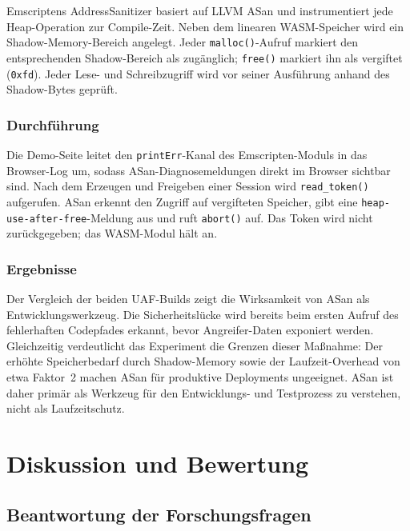 Emscriptens AddressSanitizer basiert auf LLVM ASan und instrumentiert jede Heap-Operation zur Compile-Zeit. Neben dem linearen WASM-Speicher wird ein Shadow-Memory-Bereich angelegt. Jeder \texttt{malloc()}-Aufruf markiert den entsprechenden Shadow-Bereich als zugänglich; \texttt{free()} markiert ihn als vergiftet (\texttt{0xfd}). Jeder Lese- und Schreibzugriff wird vor seiner Ausführung anhand des Shadow-Bytes geprüft.

\subsubsection{Durchführung}

Die Demo-Seite leitet den \texttt{printErr}-Kanal des Emscripten-Moduls in das Browser-Log um, sodass ASan-Diagnosemeldungen direkt im Browser sichtbar sind. Nach dem Erzeugen und Freigeben einer Session wird \texttt{read\_token()} aufgerufen. ASan erkennt den Zugriff auf vergifteten Speicher, gibt eine \texttt{heap-use-after-free}-Meldung aus und ruft \texttt{abort()} auf. Das Token wird nicht zurückgegeben; das WASM-Modul hält an.

\subsubsection{Ergebnisse}

Der Vergleich der beiden UAF-Builds zeigt die Wirksamkeit von ASan als Entwicklungswerkzeug. Die Sicherheitslücke wird bereits beim ersten Aufruf des fehlerhaften Codepfades erkannt, bevor Angreifer-Daten exponiert werden. Gleichzeitig verdeutlicht das Experiment die Grenzen dieser Maßnahme: Der erhöhte Speicherbedarf durch Shadow-Memory sowie der Laufzeit-Overhead von etwa Faktor~2 machen ASan für produktive Deployments ungeeignet. ASan ist daher primär als Werkzeug für den Entwicklungs- und Testprozess zu verstehen, nicht als Laufzeitschutz.

\clearpage

\section{Diskussion und Bewertung}

\subsection{Beantwortung der Forschungsfragen}

